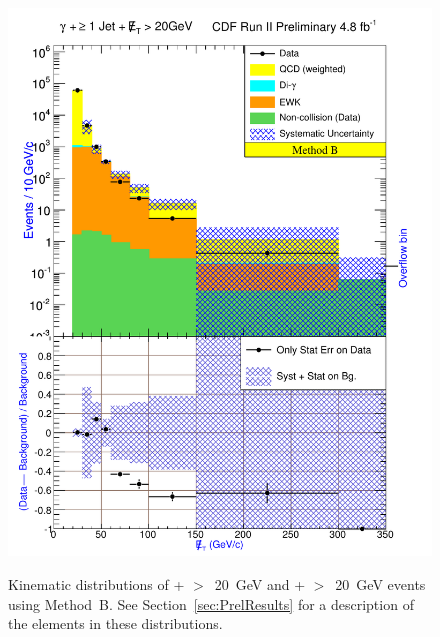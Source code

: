 \documentclass[12pt,twoside,letterpaper,doublespace]{article}
\begin{document}
\begin{figure}[h!]
\centering
\caption[Method B \phoonejet]{Kinematic distributions of \phoonejet + \met$>$~20~GeV and \photwojet + \met$>$~20~GeV events using \mbox{Method B}. See Section~\ref{sec:PrelResults} for a description of the elements in these distributions.}
{\includegraphics[keepaspectratio=true, scale=\figScale]{G30JetsMet20_MtdB_plot1_Met.pdf}}

\end{figure}
\end{document}
